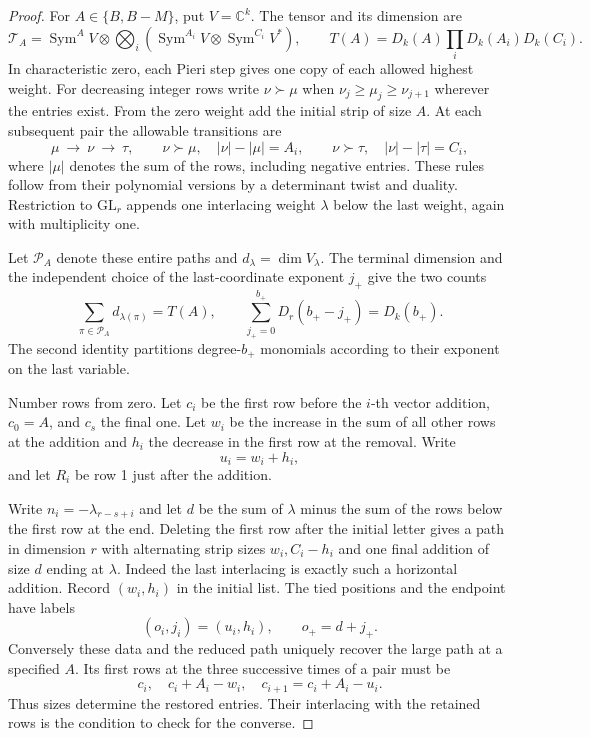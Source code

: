 \begin{proof}
For \(A\in\{B,B-M\}\), put \(V=\mathbb C^k\). The tensor and
its dimension are
\[
 \mathcal T_A=\operatorname{Sym}^{A}V\otimes
       \bigotimes_i(\operatorname{Sym}^{A_i}V\otimes
                         \operatorname{Sym}^{C_i}V^*),\qquad
 T(A)=D_k(A)\prod_i D_k(A_i)D_k(C_i).
\]
In characteristic zero, each Pieri step gives one copy of each
allowed highest weight. For decreasing integer rows write
\(\nu\succ\mu\) when \(\nu_j\ge\mu_j\ge\nu_{j+1}\) wherever
the entries exist. From the zero weight add the initial strip of
size \(A\). At each subsequent pair the allowable transitions are
\[
 \mu\ \longrightarrow\ \nu\ \longrightarrow\ \tau,\qquad
 \nu\succ\mu,\quad |\nu|-|\mu|=A_i,\qquad
 \nu\succ\tau,\quad |\nu|-|\tau|=C_i ,
\]
where \(|\mu|\) denotes the sum of the rows, including negative
entries. These rules follow from their polynomial versions by a
determinant twist and duality. Restriction to \(\mathrm{GL}_r\)
appends one interlacing weight \(\lambda\) below the last weight,
again with multiplicity one. \cite{fulton-harris}

Let \(\mathcal P_A\) denote these entire paths and
\(d_\lambda=\dim V_\lambda\). The terminal dimension and the
independent choice of the last-coordinate exponent \(j_+\)
give the two counts
\begin{equation}\label{eq:retained-path-dimensions}
 \sum_{\pi\in\mathcal P_A}d_{\lambda(\pi)}=T(A),\qquad
 \sum_{j_+=0}^{b_+}D_r(b_+-j_+)=D_k(b_+).
\end{equation}
The second identity partitions degree-\(b_+\) monomials
according to their exponent on the last variable.

Number rows from zero. Let \(c_i\) be the first row before
the \(i\)-th vector addition, \(c_0=A\), and \(c_s\) the final
one. Let \(w_i\) be the increase in the sum of all other
rows at the addition and \(h_i\) the decrease in the first
row at the removal. Write
\[
 u_i=w_i+h_i,
\]
and let \(R_i\)
be row 1 just after the addition.

Write \(n_i=-\lambda_{r-s+i}\)
and let \(d\) be the sum of \(\lambda\) minus the sum of the
rows below the first row at the end. Deleting the first row
after the initial letter gives a path in dimension \(r\)
with alternating strip sizes \(w_i,C_i-h_i\) and one final
addition of size \(d\) ending at \(\lambda\). Indeed the last
interlacing is exactly such a horizontal addition. Record \((w_i,h_i)\) in the initial list. The tied positions and the endpoint have labels
\[
 (o_i,j_i)=(u_i,h_i),\qquad o_+=d+j_+.
\]
Conversely these data and
the reduced path uniquely recover the large path at a
specified \(A\). Its first rows at the three successive times
of a pair must be
\[
 c_i,\quad c_i+A_i-w_i,\quad c_{i+1}=c_i+A_i-u_i .
\]
Thus sizes determine the restored entries. Their interlacing
with the retained rows is the condition to check for the
converse.


\end{proof}
